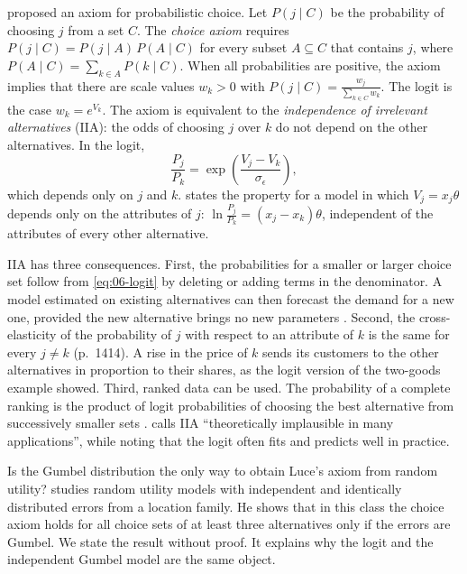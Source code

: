 \citet{Luce1959} proposed an axiom for probabilistic choice. Let $P(j \mid C)$ be the probability of choosing
$j$ from a set $C$. The \emph{choice axiom} requires $P(j \mid C) = P(j \mid A)\,P(A \mid C)$ for every subset
$A \subseteq C$ that contains $j$, where $P(A \mid C) = \sum_{k\in A}P(k \mid C)$. When all probabilities are
positive, the axiom implies that there are scale values $w_k > 0$ with
$P(j \mid C) = \frac{w_j}{\sum_{k \in C} w_k}$. The logit is the case $w_k = e^{V_k}$. The axiom is
equivalent to the \emph{independence of irrelevant alternatives} (IIA): the odds of choosing $j$ over $k$ do not
depend on the other alternatives. In the logit,
\begin{equation}\label{eq:06-iia}
\frac{P_j}{P_k} = \exp\left(\frac{V_j - V_k}{\sigma_\epsilon}\right) ,
\end{equation}
which depends only on $j$ and $k$. \citet[eq.~3.17, p.~1413]{McFadden1984} states the property for a model in
which $V_j = x_j\theta$ depends only on the attributes of $j$: $\ln\frac{P_j}{P_k} = (x_j - x_k)\theta$, independent
of the attributes of every other alternative.

IIA has three consequences. First, the probabilities for a smaller or larger choice set follow from
\eqref{eq:06-logit} by deleting or adding terms in the denominator. A model estimated on existing alternatives
can then forecast the demand for a new one, provided the new alternative brings no new parameters
\citep[p.~1414]{McFadden1984}. Second, the cross-elasticity of the probability of $j$ with respect to an attribute
of $k$ is the same for every $j \neq k$ (p.~1414). A rise in the price of $k$ sends its customers to the other
alternatives in proportion to their shares, as the logit version of the two-goods example showed. Third, ranked data can be used.
The probability of a complete ranking is the product of logit probabilities of choosing the best alternative
from successively smaller sets \citep{Marschak1960}. \citet[p.~1414]{McFadden1984} calls IIA ``theoretically
implausible in many applications'', while noting that the logit often fits and predicts well in practice.

\begin{remark}\label{rem:06-yellott}
Is the Gumbel distribution the only way to obtain Luce's axiom from random utility? \citet{Yellott1977} studies
random utility models with independent and identically distributed errors from a location family. He shows
that in this class the choice axiom holds for all choice sets of at least three alternatives only if the errors
are Gumbel. We
state the result without proof. It explains why the logit and the independent Gumbel model are the same
object.
\end{remark}

